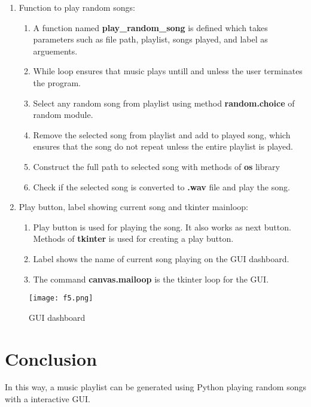 \documentclass[journal,12pt,twocolumn]{IEEEtran}
\begin{document}
\begin{enumerate}
\begin{enumerate}
		\end{enumerate}
	\item
		Function to play random songs:
		\begin{enumerate}
			\item[\textbullet]
				A function named \textbf{play\_random\_song} is defined which takes parameters such as file path, playlist, songs played, and label as arguements.
			\item[\textbullet]
				While loop ensures that music plays untill and unless the user terminates the program.
			\item[\textbullet]
				Select any random song from playlist using method \textbf{random.choice} of random module.
			\item[\textbullet]
				Remove the selected song from playlist and add to played song, which ensures that the song do not repeat unless the entire playlist is played.
			\item[\textbullet]
				Construct the full path to selected song with methods of \textbf{os} library
			\item[\textbullet]
				Check if the selected song is converted to \textbf{.wav} file and play the song.
		\end{enumerate}
	\item
		Play button, label showing current song and tkinter mainloop:
		\begin{enumerate}
			\item[\textbullet]
				Play button is used for playing the song. It also works as next button. Methods of \textbf{tkinter} is used for creating a play button.
			\item[\textbullet]
				Label shows the name of current song playing on the GUI dashboard.
			\item[\textbullet]
				The command \textbf{canvas.mailoop} is the tkinter loop for the GUI.
		\end{enumerate}

\end{enumerate}
\begin{figure}[H]
	\texttt{[image: f5.png]}
	\caption{GUI dashboard}
	\label{GUI}
\end{figure}

\section*{\textbf{Conclusion}}
In this way, a music playlist can be generated using Python playing random songs with a interactive GUI.
\end{document}
